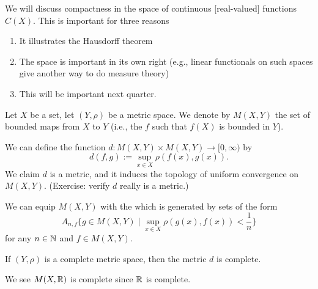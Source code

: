 
\lecture{}

\begin{node}
We will discuss compactness in the space of continuous [real-valued]
functions $C(X)$.  This is important for three reasons
\begin{enumerate}
\item It illustrates the Hausdorff theorem
\item The space is important in its own right (e.g., linear
  functionals on such spaces give another way to do measure theory)
\item This will be important next quarter.
\end{enumerate}
\end{node}

\begin{notation}
Let $X$ be a set, let $(Y,\rho)$ be a metric space. We denote by $M(X,Y)$ the
set of bounded maps from $X$ to $Y$ (i.e., the $f$ such that $f(X)$ is
bounded in $Y$).

We can define the function $d\colon M(X,Y)\times M(X,Y)\to[0,\infty)$
by
\begin{equation}
d(f,g) := \sup_{x\in X}\rho(f(x),g(x)).
\end{equation}
We claim $d$ is a metric, and it induces the topology of uniform
convergence on $M(X,Y)$. (Exercise: verify $d$ really is a metric.)
\end{notation}

\begin{remark}
We can equip $M(X,Y)$ with the  which 
is generated by sets of the form
\begin{equation}
A_{n,f}\{g\in M(X,Y)\mid\sup_{x\in X}\rho(g(x),f(x))<\frac{1}{n}\}
\end{equation}
for any $n\in\mathbb{N}$ and $f\in M(X,Y)$. 
\end{remark}

\begin{proposition}
If $(Y,\rho)$ is a complete metric space, then the metric $d$ is complete.
\end{proposition}

\begin{example}
We see $M(X,\mathbb{R})$ is complete since $\mathbb{R}$ is complete.
\end{example}

